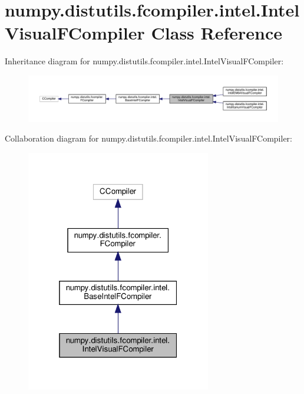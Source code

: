 \hypertarget{classnumpy_1_1distutils_1_1fcompiler_1_1intel_1_1IntelVisualFCompiler}{}\section{numpy.\+distutils.\+fcompiler.\+intel.\+Intel\+Visual\+F\+Compiler Class Reference}
\label{classnumpy_1_1distutils_1_1fcompiler_1_1intel_1_1IntelVisualFCompiler}


Inheritance diagram for numpy.\+distutils.\+fcompiler.\+intel.\+Intel\+Visual\+F\+Compiler\+:
\nopagebreak
\begin{figure}[H]
\begin{center}
\leavevmode
\includegraphics[width=350pt]{classnumpy_1_1distutils_1_1fcompiler_1_1intel_1_1IntelVisualFCompiler__inherit__graph}
\end{center}
\end{figure}


Collaboration diagram for numpy.\+distutils.\+fcompiler.\+intel.\+Intel\+Visual\+F\+Compiler\+:
\nopagebreak
\begin{figure}[H]
\begin{center}
\leavevmode
\includegraphics[width=229pt]{classnumpy_1_1distutils_1_1fcompiler_1_1intel_1_1IntelVisualFCompiler__coll__graph}
\end{center}
\end{figure}
